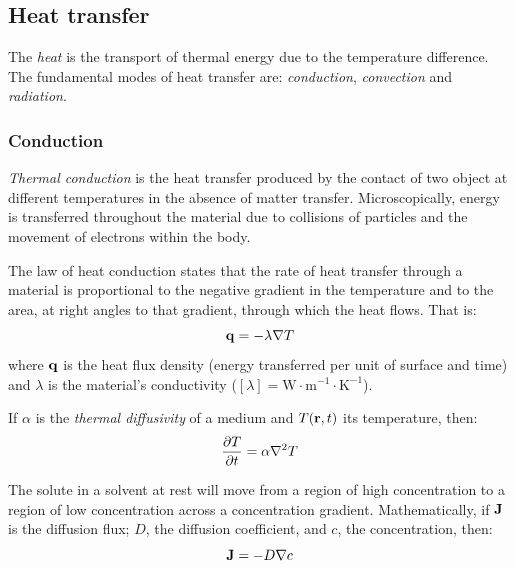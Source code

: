 \documentclass[../../../main.tex]{subfiles}
\begin{document}
\begin{multicols}{2}
    \subsection{Heat transfer}
    \begin{definition}[Heat]
        The \textit{heat} is the transport of thermal energy due to the temperature difference. The fundamental modes of heat transfer are: \textit{conduction}, \textit{convection} and \textit{radiation}.
    \end{definition}
    \subsubsection*{Conduction}
    \begin{definition}[Conduction]
        \textit{Thermal conduction} is the heat transfer produced by the contact of two object at different temperatures in the absence of matter transfer. Microscopically, energy is transferred throughout the material due to collisions of particles and the movement of electrons within the body.
    \end{definition}
    \begin{prop}
        The law of heat conduction states that the rate of heat transfer through a material is proportional to the negative gradient in the temperature and to the area, at right angles to that gradient, through which the heat flows. That is:
        $$\vb{q}=-\lambda\nabla T$$ where $\vb{q}$ is the heat flux density (energy transferred per unit of surface and time) and $\lambda$ is the material's conductivity ($[\lambda]=\text{W}\cdot\text{m}^{-1}\cdot\text{K}^{-1}$).
    \end{prop}
    \begin{prop}
        If $\alpha$ is the \textit{thermal diffusivity} of a medium and $T(\vb{r},t)$ its temperature, then:
        $$\pdv{T}{t}=\alpha\nabla^2 T$$
    \end{prop}
    \begin{prop}
        The solute in a solvent at rest will move from a region of high concentration to a region of low concentration across a concentration gradient. Mathematically, if $\vb{J}$ is the diffusion flux; $D$, the diffusion coefficient, and $c$, the concentration, then:
        $$\vb{J}=-D\nabla c$$
    \end{prop}
    \begin{prop}

\end{prop}
\end{multicols}
\end{document}
